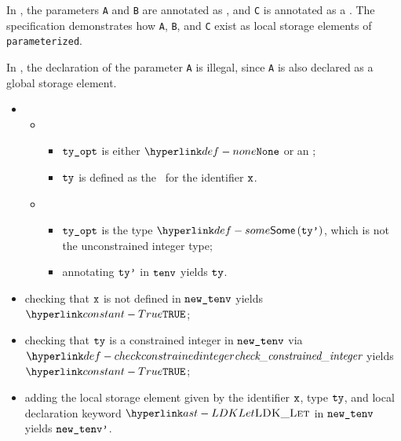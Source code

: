 In ,
the parameters \verb|A| and \verb|B| are annotated as \parameterizedintegertypesterm,
and \verb|C| is annotated as a \wellconstrainedintegertypeterm.
The specification demonstrates how \verb|A|, \verb|B|, and \verb|C| exist as local storage elements
of \verb|parameterized|.

In , the declaration of the parameter \verb|A| is illegal,
since \verb|A| is also declared as a global storage element.

\ProseParagraph
\AllApply
\begin{itemize}
  \item \OneApplies
  \begin{itemize}
    \item {}
    \begin{itemize}
      \item $\texttt{ty\_opt}$ is either $\None$ or an \unconstrainedintegertypeterm{};
      \item $\texttt{ty}$ is defined as the \parameterizedintegertypeterm\ for the identifier $\texttt{x}$.
    \end{itemize}

    \item {}
    \begin{itemize}
      \item $\texttt{ty\_opt}$ is the type $\some{\ttyp}$, which is not the unconstrained integer type;
      \item annotating $\texttt{ty'}$ in $\texttt{tenv}$ yields $\texttt{ty}$\ProseOrTypeError.
    \end{itemize}
  \end{itemize}
  \item checking that $\texttt{x}$ is not defined in $\texttt{new\_tenv}$ yields $\True$\ProseOrTypeError;
  \item checking that $\texttt{ty}$ is a constrained integer in $\texttt{new\_tenv}$ via $\checkconstrainedinteger$
        yields $\True$\ProseOrTypeError;
  \item adding the local storage element given by the identifier $\texttt{x}$, type $\texttt{ty}$, and local declaration keyword
        $\LDKLet$ in $\texttt{new\_tenv}$ yields $\texttt{new\_tenv'}$.
\end{itemize}

